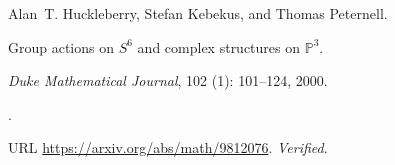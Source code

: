 Alan~T. Huckleberry, Stefan Kebekus, and Thomas Peternell.

\newblock Group actions on {$S^6$} and complex structures on {$\mathbb P^3$}.

\newblock \emph{Duke Mathematical Journal}, 102 (1):
  101--124, 2000.

\newblock {}.

\newblock URL \url{https://arxiv.org/abs/math/9812076}.
\newblock \emph{Verified}.


